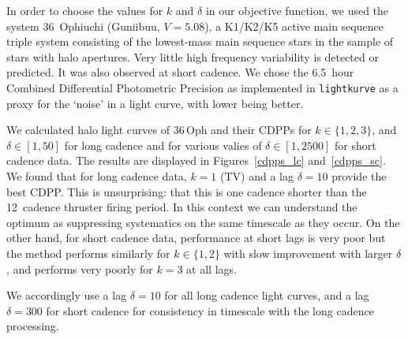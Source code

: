 \documentclass[modern]{aastex62}
\begin{document}
In order to choose the values for $k$ and $\delta$ in our objective function, we used the system 36~Ophiuchi (Guniibuu, $V= 5.08$), a K1/K2/K5 active main sequence triple system consisting of the lowest-mass main sequence stars in the sample of stars with halo apertures. Very little high frequency variability is detected or predicted. It was also observed at short cadence. We chose the 6.5~hour Combined Differential Photometric Precision \citep[CDPP,][]{cdpp} as implemented in \texttt{lightkurve} as a proxy for the `noise' in a light curve, with lower being better. 

We calculated halo light curves of 36\,Oph and their CDPPs for $k \in \{1,2,3\}$, and $\delta \in [1,50]$ for long cadence and for various valies of $\delta \in [1,2500]$ for short cadence data. The results are displayed in Figures~\ref{cdpps_lc} and~\ref{cdpps_sc}. We found that for long cadence data, $k=1$ (TV) and a lag $\delta=10$ provide the best CDPP. This is unsurprising: that this is one cadence shorter than the 12~cadence thruster firing period. In this context we can understand the optimum as suppressing systematics on the same timescale as they occur. On the other hand, for short cadence data, performance at short lags is very poor but the method performs similarly for $k \in \{1,2\}$ with slow improvement with larger $\delta$, and performs very poorly for $k=3$ at all lags. 

We accordingly use a lag $\delta=10$ for all long cadence light curves, and a lag $\delta=300$ for short cadence for consistency in timescale with the long cadence processing.



\end{document}
